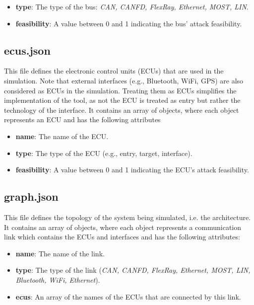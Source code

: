\begin{itemize}
\item \textbf{type}: The type of the bus: \textit{CAN, CANFD, FlexRay, Ethernet, MOST, LIN}.
\item \textbf{feasibility}: A value between 0 and 1 indicating the bus' attack feasibility.
\end{itemize}

\subsection{ecus.json}
\label{sec:ecus}

This file defines the electronic control units (ECUs) that are used in the simulation. 
Note that external interfaces (e.g., Bluetooth, WiFi, GPS) are also considered as ECUs in the simulation.
Treating them as ECUs simplifies the implementation of the tool, as not the ECU is treated as entry but rather the technology of the interface.
It contains an array of objects, where each object represents an ECU and has the following attributes

\begin{itemize}
\item \textbf{name}: The name of the ECU.
\item \textbf{type}: The type of the ECU (e.g., entry, target, interface).
\item \textbf{feasibility}: A value between 0 and 1 indicating the ECU's attack feasibility.
\end{itemize}

\subsection{graph.json}
\label{sec:graph}

This file defines the topology of the system being simulated, i.e. the architecture. 
It contains an array of objects, where each object represents a communication link which contains the ECUs and interfaces and has the following attributes:

\begin{itemize}
\item \textbf{name}: The name of the link.
\item \textbf{type}: The type of the link (\textit{CAN, CANFD, FlexRay, Ethernet, MOST, LIN, Bluetooth, WiFi, Ethernet}).
\item \textbf{ecus}: An array of the names of the ECUs that are connected by this link.
\end{itemize}


